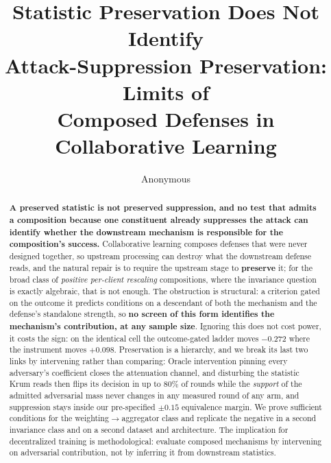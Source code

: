 \documentclass{article}
\title{Statistic Preservation Does Not Identify\\Attack-Suppression Preservation: Limits of\\Composed Defenses in Collaborative Learning}
\author{Anonymous}
\begin{document}
\maketitle

\begin{abstract}
\textbf{A preserved statistic is not preserved suppression, and no test that admits a composition because one constituent already suppresses the attack can identify whether the downstream mechanism is responsible for the composition's success.} Collaborative learning composes defenses that were never designed together, so upstream processing can destroy what the downstream defense reads, and the natural repair is to require the upstream stage to \textbf{preserve} it; for the broad class of \emph{positive per-client rescaling} compositions, where the invariance question is exactly algebraic, that is not enough. The obstruction is structural: a criterion gated on the outcome it predicts conditions on a descendant of both the mechanism and the defense's standalone strength, so \textbf{no screen of this form identifies the mechanism's contribution, at any sample size}. Ignoring this does not cost power, it costs the sign: on the identical cell the outcome-gated ladder moves $-0.272$ where the instrument moves $+0.098$. Preservation is a hierarchy, and we break its last two links by intervening rather than comparing: Oracle intervention pinning every adversary's coefficient closes the attenuation channel, and disturbing the statistic Krum reads then flips its decision in up to $80\%$ of rounds while the \emph{support} of the admitted adversarial mass never changes in any measured round of any arm, and suppression stays inside our pre-specified $\pm0.15$ equivalence margin. We prove sufficient conditions for the weighting$\to$aggregator class and replicate the negative in a second invariance class and on a second dataset and architecture. The implication for decentralized training is methodological: evaluate composed mechanisms by intervening on adversarial contribution, not by inferring it from downstream statistics.
\end{abstract}
\end{document}
